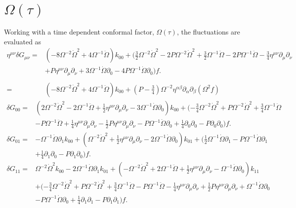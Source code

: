 \documentclass[10pt,letterpaper]{article}
\begin{document}
\section*{$\Omega(\tau)$}
Working with a time dependent conformal factor, $\Omega(\tau)$, the fluctuations are evaluated as 
\begin{align}
\eta^{\mu\nu}\delta G_{\mu\nu}={}&(-8 \Omega^{-2} \dot{\Omega}^2
 + 4 \Omega^{-1} \ddot{\Omega}) k_{00}
 + (\tfrac{3}{2} \Omega^{-2} \dot{\Omega}^2
 - 2 P \Omega^{-2} \dot{\Omega}^2
 + \tfrac{3}{2} \Omega^{-1} \ddot{\Omega}
 - 2 P \Omega^{-1} \ddot{\Omega}
 -  \tfrac{3}{4} \eta^{\mu \nu} \partial_{\mu} \partial_{\nu}\nonumber\\
& + P \eta^{\mu \nu} \partial_{\mu} \partial_{\nu}
 + 3 \Omega^{-1} \dot{\Omega} \partial_{0}
 - 4 P \Omega^{-1} \dot{\Omega} \partial_{0}) f.
\nonumber \\ \nonumber \\
={}&(-8 \Omega^{-2} \dot{\Omega}^2
 + 4 \Omega^{-1} \ddot{\Omega}) k_{00} +(P-\tfrac34) \Omega^{-2}\eta^{\alpha\beta}\partial_\alpha\partial_\beta (\Omega^{2} f)
\end{align}
\begin{align}
\delta G_{00}={}&(2 \Omega^{-2} \dot{\Omega}^2
 - 2 \Omega^{-1} \ddot{\Omega}
 + \tfrac{1}{2} \eta^{\mu \nu} \partial_{\mu} \partial_{\nu}
 - 3 \Omega^{-1} \dot{\Omega} \partial_{0}) k_{00}
 + (- \tfrac{3}{4} \Omega^{-2} \dot{\Omega}^2
 + P \Omega^{-2} \dot{\Omega}^2
 + \tfrac{3}{4} \Omega^{-1} \ddot{\Omega}\nonumber\\
& -  P \Omega^{-1} \ddot{\Omega}
 + \tfrac{1}{4} \eta^{\mu \nu} \partial_{\mu} \partial_{\nu}
 -  \tfrac{1}{2} P \eta^{\mu \nu} \partial_{\mu} \partial_{\nu}
 -  P \Omega^{-1} \dot{\Omega} \partial_{0}
 + \tfrac{1}{4} \partial_{0} \partial_{0}
 -  P \partial_{0} \partial_{0}) f.
\end{align}
\begin{align}
\delta G_{01}={}&- \Omega^{-1} \dot{\Omega} \partial_{1} k_{00}
 + (\Omega^{-2} \dot{\Omega}^2
 + \tfrac{1}{2} \eta^{\mu \nu} \partial_{\mu} \partial_{\nu}
 - 2 \Omega^{-1} \dot{\Omega} \partial_{0}) k_{01}
 + (\tfrac{1}{2} \Omega^{-1} \dot{\Omega} \partial_{1}
 -  P \Omega^{-1} \dot{\Omega} \partial_{1}\nonumber\\
& + \tfrac{1}{4} \partial_{1} \partial_{0}
 -  P \partial_{1} \partial_{0}) f.
\end{align}
\begin{align}
\delta G_{11}={}&\Omega^{-2} \dot{\Omega}^2 k_{00}
 - 2 \Omega^{-1} \dot{\Omega} \partial_{1} k_{01}
 + (- \Omega^{-2} \dot{\Omega}^2
 + 2 \Omega^{-1} \ddot{\Omega}
 + \tfrac{1}{2} \eta^{\mu \nu} \partial_{\mu} \partial_{\nu}
 -  \Omega^{-1} \dot{\Omega} \partial_{0}) k_{11}\nonumber\\
& + (- \tfrac{3}{4} \Omega^{-2} \dot{\Omega}^2
 + P \Omega^{-2} \dot{\Omega}^2
 + \tfrac{3}{4} \Omega^{-1} \ddot{\Omega}
 -  P \Omega^{-1} \ddot{\Omega}
 -  \tfrac{1}{4} \eta^{\mu \nu} \partial_{\mu} \partial_{\nu}
 + \tfrac{1}{2} P \eta^{\mu \nu} \partial_{\mu} \partial_{\nu}
 + \Omega^{-1} \dot{\Omega} \partial_{0}\nonumber\\
& -  P \Omega^{-1} \dot{\Omega} \partial_{0}
 + \tfrac{1}{4} \partial_{1} \partial_{1}
 -  P \partial_{1} \partial_{1}) f.
\end{align}
\end{document}
